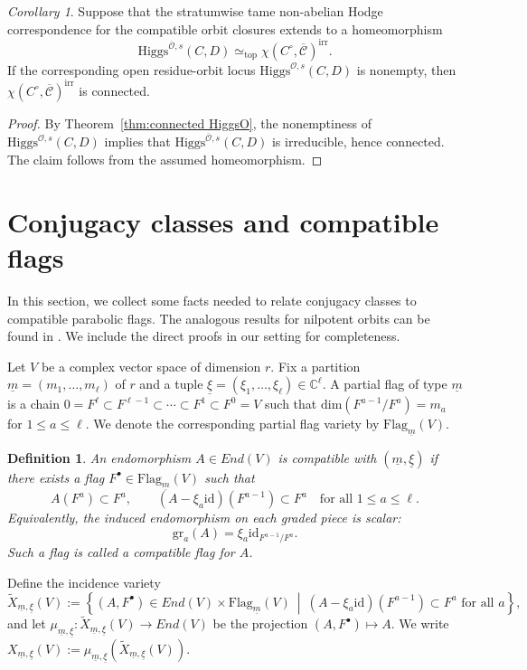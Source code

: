 \documentclass[11pt]{amsart}
\theoremstyle{plain}
\newtheorem{definition}[theorem]{Definition}
\theoremstyle{definition}
\theoremstyle{remark}
\newtheorem{corollary}[theorem]{Corollary}
\newcommand{\C}{\mathbb C}
\newcommand{\id}{\mathrm{id}}
\newcommand{\gr}{\operatorname{gr}}
\newcommand{\Flag}{\mathrm{Flag}}
\newcommand{\cO}{\mathcal O}
\newcommand{\Higgs}{\mathrm{Higgs}}
\def\C{\mathbb{C}}
\def\dim{\mathrm{dim}}
\def\gr{\textrm{gr}}
\def\uxi{{\underline{\xi}}}
\def\um{{\underline{m}}}
\begin{document}
\begin{corollary}
    Suppose that the stratumwise tame non-abelian Hodge correspondence for the compatible orbit closures extends to a homeomorphism
    \[
    \Higgs^{\overline{\cO},s}(C,D)
    \simeq_{\mathrm{top}}
    \chi(C^\circ,\overline{\mathcal C})^{\mathrm{irr}}.
    \]
    If the corresponding open residue-orbit locus $\Higgs^{\cO,s}(C,D)$ is nonempty, then
    $\chi(C^\circ,\overline{\mathcal C})^{\mathrm{irr}}$ is connected.
\end{corollary}

\begin{proof}
    By Theorem~\ref{thm:connected HiggsO}, the nonemptiness of $\Higgs^{\cO,s}(C,D)$ implies that $\Higgs^{\overline{\cO},s}(C,D)$ is irreducible, hence connected. The claim follows from the assumed homeomorphism.
\end{proof}


\appendix
\section{Conjugacy classes and compatible flags}\label{sec:local-linear-algebra}
In this section, we collect some facts needed to relate conjugacy classes to compatible parabolic flags. The analogous results for nilpotent orbits can be found in \cite[Section 3]{BorhoMacPherson1983}. We include the direct proofs in our setting for completeness.

Let $V$ be a complex vector space of dimension
$r$. Fix a partition $\um=(m_1,\ldots,m_\ell)$ of $r$ and a tuple
$\uxi=(\xi_1,\ldots,\xi_\ell)\in\C^\ell$. A partial flag of type $\um$ is a chain
$0=F^\ell\subset F^{\ell-1}\subset\cdots\subset F^1\subset F^0=V$ such that
$\dim(F^{a-1}/F^a)=m_a$ for $1\leq a\leq \ell$. We denote the corresponding
partial flag variety by $\Flag_{\um}(V)$.

\begin{definition}\label{def:compatible}
	An endomorphism $A\in End(V)$ is \emph{compatible with $(\um,\uxi)$} if there
	exists a flag $F^\bullet\in\Flag_{\um}(V)$ such that
	\[
	A(F^a)\subset F^a,
	\qquad
	(A-\xi_a\id)(F^{a-1})\subset F^a
	\quad\text{for all }1\leq a\leq \ell.
	\]
	Equivalently, the induced endomorphism on each graded piece is scalar:
	\[\gr_a(A)=\xi_a\id_{F^{a-1}/F^a}.\]
	 Such a flag is called a
	\emph{compatible flag} for $A$.
\end{definition}

\noindent Define the incidence variety
\[
\widetilde X_{\um,\uxi}(V)
:=
\left\{
(A,F^\bullet)\in End(V)\times \Flag_{\um}(V)
\ \middle|\
(A-\xi_a\id)(F^{a-1})\subset F^a\text{ for all }a
\right\},
\]
and let $\mu_{\um,\uxi}:\widetilde X_{\um,\uxi}(V)\to End(V)$ be the projection
$(A,F^\bullet)\mapsto A$. We write
$X_{\um,\uxi}(V):=\mu_{\um,\uxi}(\widetilde X_{\um,\uxi}(V))$.
\end{document}
